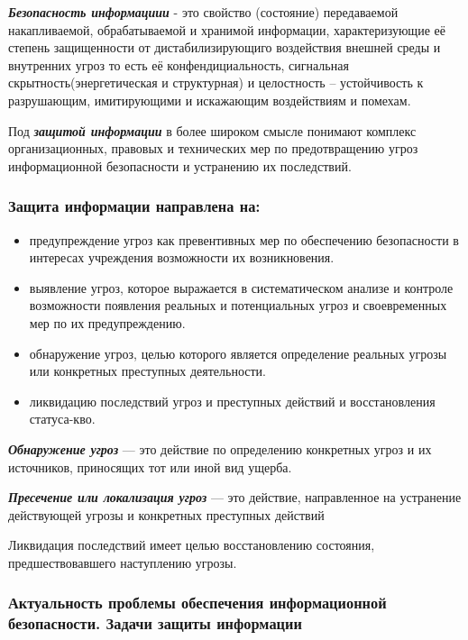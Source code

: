 \documentclass[a4paper,12pt]{extarticle}
\begin{document}
	\textbf{\textit{Безопасность информациии}} - это свойство (состояние) передаваемой накапливаемой, обрабатываемой и хранимой информации, характеризующие её степень защищенности от дистабилизирующиго воздействия внешней среды и внутренних угроз то есть её конфендициальность, сигнальная скрытность(энергетическая и структурная) и целостность -- устойчивость к разрушающим, имитирующими и искажающим воздействиям и помехам.	
	
	Под \textbf{\textit{защитой информации}} в более широком смысле понимают комплекс организационных, правовых и технических мер по предотвращению угроз информационной безопасности и устранению их последствий.
	
	\subsubsection*{Защита информации направлена на:}
	\begin{itemize}
		\item  предупреждение угроз как превентивных мер по обеспечению безопасности в интересах учреждения возможности их возникновения.
		\item  выявление угроз, которое выражается в систематическом анализе и контроле возможности появления реальных и потенциальных угроз и своевременных мер по их предупреждению.
		\item  обнаружение угроз, целью которого является определение реальных угрозы или конкретных преступных деятельности.
		\item  ликвидацию последствий угроз и преступных действий и восстановления статуса-кво.
	\end{itemize}

	\textbf{\textit{Обнаружение угроз}} --- это действие по определению конкретных угроз и их источников, приносящих тот или иной вид ущерба.
	
	\textbf{\textit{Пресечение или локализация угроз}} --- это действие, направленное на устранение действующей угрозы и конкретных преступных действий 
	
	Ликвидация последствий имеет целью восстановлению состояния, предшествовавшего наступлению угрозы.
	\subsubsection{Актуальность проблемы обеспечения информационной безопасности. Задачи защиты информации}
	
\end{document}
